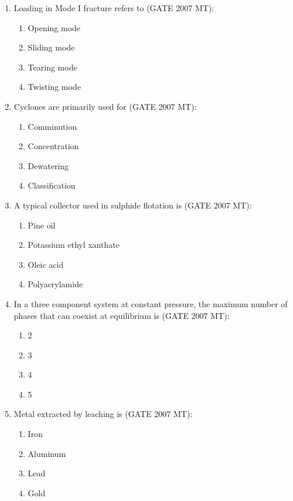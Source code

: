 \documentclass[12pt]{article}
\begin{document}
\begin{enumerate}
\item Loading in Mode I fracture refers to (GATE 2007 MT):
    \begin{enumerate}
        \item Opening mode
        \item Sliding mode
        \item Tearing mode
        \item Twisting mode
    \end{enumerate}

\item Cyclones are primarily used for (GATE 2007 MT):
    \begin{enumerate}
        \item Comminution
        \item Concentration
        \item Dewatering
        \item Classification
    \end{enumerate}

\item A typical collector used in sulphide flotation is (GATE 2007 MT):
    \begin{enumerate}
        \item Pine oil
        \item Potassium ethyl xanthate
        \item Oleic acid
        \item Polyacrylamide
    \end{enumerate}

\item In a three component system at constant pressure, the maximum number of phases that can coexist at equilibrium is (GATE 2007 MT):
    \begin{enumerate}
        \item 2
        \item 3
        \item 4
        \item 5
    \end{enumerate}

\item Metal extracted by leaching is (GATE 2007 MT):
    \begin{enumerate}
        \item Iron
        \item Aluminum
        \item Lead
        \item Gold
    \end{enumerate}


\end{enumerate}
\end{document}
